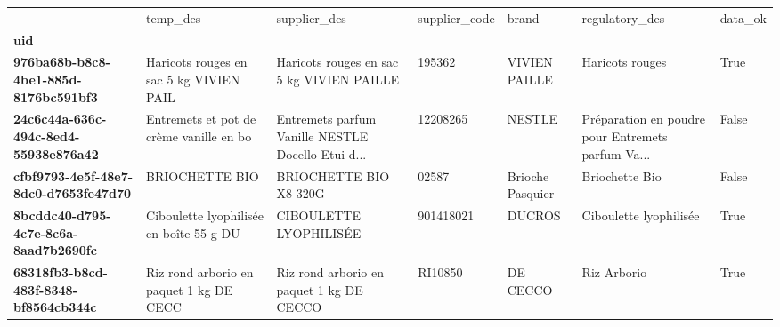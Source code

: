 \begin{tabularx}{\linewidth}{lXXXXXX}
\toprule
{} &                                 temp\_des &                                       supplier\_des & supplier\_code &             brand &                                     regulatory\_des &  data\_ok \\
\textbf{uid                                 } &                                          &                                                    &               &                   &                                                    &          \\
\midrule
\textbf{976ba68b-b8c8-4be1-885d-8176bc591bf3} &  Haricots rouges en sac 5 kg VIVIEN PAIL &          Haricots rouges en sac 5 kg VIVIEN PAILLE &        195362 &     VIVIEN PAILLE &                                    Haricots rouges &     True \\
\textbf{24c6c44a-636c-494c-8ed4-55938e876a42} &  Entremets et pot de crème vanille en bo &  Entremets parfum Vanille NESTLE Docello Etui d... &      12208265 &            NESTLE &  Préparation en poudre pour Entremets parfum Va... &    False \\
\textbf{cfbf9793-4e5f-48e7-8dc0-d7653fe47d70} &                           BRIOCHETTE BIO &                             BRIOCHETTE BIO X8 320G &         02587 &  Brioche Pasquier &                                     Briochette Bio &    False \\
\textbf{8bcddc40-d795-4c7e-8c6a-8aad7b2690fc} &  Ciboulette lyophilisée en boîte 55 g DU &                            CIBOULETTE LYOPHILISÉE  &     901418021 &            DUCROS &                             Ciboulette lyophilisée &     True \\
\textbf{68318fb3-b8cd-483f-8348-bf8564cb344c} &  Riz rond arborio en paquet 1 kg DE CECC &           Riz rond arborio en paquet 1 kg DE CECCO &       RI10850 &          DE CECCO &                                        Riz Arborio &     True \\
\bottomrule
\end{tabularx}
